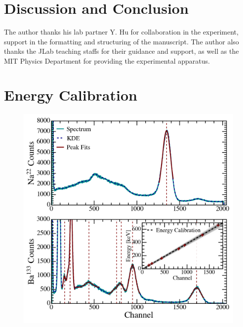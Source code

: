 \documentclass[aps,twocolumn,secnumarabic,balancelastpage,amsmath,amssymb,nofootinbib,floatfix]{revtex4-1}
\begin{document}


\section{Discussion and Conclusion}
\label{sec:conclusion}




\begin{acknowledgments}

The author thanks his lab partner  Y. Hu for collaboration in the experiment, support in the formatting and structuring of the manuscript. The author also thanks the JLab teaching staffs for their guidance and support, as well as the MIT Physics Department for providing the experimental apparatus.

\end{acknowledgments}





\appendix

\section{Energy Calibration}
\label{app:energy_calibration}

\begin{figure}
    \centering
    \includegraphics[width=0.49 \textwidth]{Figures/energy_calibration.png}
    \caption{}
    \label{fig:energy_calibration}
\end{figure}
\end{document}
